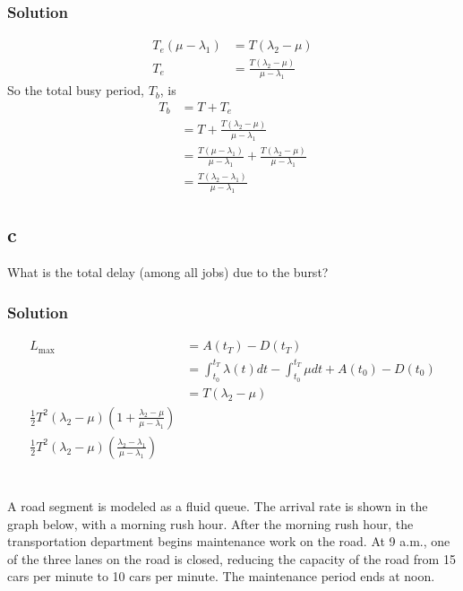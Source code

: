 \documentclass[letterpaper]{amsart}
\begin{document}
\subsubsection*{Solution}
\begin{align}
  T_e(\mu - \lambda_1) &= T(\lambda_2 - \mu) \\
  T_e &= \frac{T(\lambda_2 - \mu)}{\mu - \lambda_1}
\end{align}
So the total busy period, $T_b$, is
\begin{align}
  T_b &= T + T_e \\
  &= T + \frac{T(\lambda_2 - \mu)}{\mu-\lambda_1} \\
      &= \frac{T(\mu-\lambda_1)}{\mu-\lambda_1} + \frac{T(\lambda_2 - \mu)}{\mu-\lambda_1} \\
  &=\frac{T(\lambda_2-\lambda_1)}{\mu-\lambda_1}
\end{align}

\subsection*{c}
What is the total delay (among all jobs) due to the burst?

\subsubsection*{Solution}
\begin{align}
  L_\text{max} &= A(t_T) - D(t_T) \\
  &= \int_{t_0}^{t_T}\lambda(t)dt - \int_{t_0}^{t_T}\mu dt + A(t_0)-D(t_0) \\
               &= T(\lambda_2 - \mu)\\
  \frac{1}{2}T^2(\lambda_2-\mu)\left( 1+\frac{\lambda_2-\mu}{\mu-\lambda_1} \right)\\
  \frac{1}{2}T^2(\lambda_2-\mu)\left( \frac{\lambda_2-\lambda_1}{\mu-\lambda_1} \right)
\end{align}

\section{} %
A road segment is modeled as a fluid queue. The arrival rate is shown in the graph below,
with a morning rush hour. After the morning rush hour, the transportation department
begins maintenance work on the road. At 9 a.m., one of the three lanes on the road is
closed, reducing the capacity of the road from 15 cars per minute to 10 cars per minute.
The maintenance period ends at noon.
\end{document}

